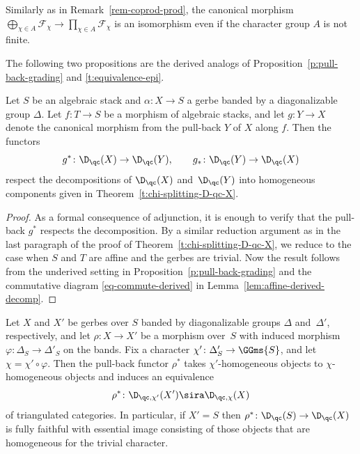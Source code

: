 \begin{remark}
Similarly as in Remark~\ref{rem-coprod-prod}, the canonical morphism
$
\bigoplus_{\chi\in A} \mathcal{F}_\chi
\to
\prod_{\chi\in A} \mathcal{F}_\chi
$
is an isomorphism even if the character group
$A$ is not finite.
\end{remark}

The following two propositions are the derived analogs of
Proposition~\ref{p:pull-back-grading} and \ref{t:equivalence-epi}.

\begin{proposition}
\label{p:pull-back-grading-derived}
Let $S$ be an algebraic stack and 
$\alpha\colon X \to S$ a gerbe banded by a diagonalizable group
$\Delta$.
Let $f\colon T \to S$ be a morphism of algebraic stacks,
and let $g\colon Y \to X$ denote the canonical morphism from the pull-back
$Y$ of $X$ along $f$.
Then the functors
$$
g^*\colon \D_\qc(X) \to \D_\qc(Y), \qquad
g_*\colon \D_\qc(Y) \to \D_\qc(X)
$$
respect the decompositions of $\D_\qc(X)$ and~$\D_\qc(Y)$
into homogeneous components given in Theorem~\ref{t:chi-splitting-D-qc-X}.
\end{proposition}
\begin{proof}
As a formal consequence of adjunction,
it is enough to verify that the pull-back $g^*$ respects the decomposition.
By a similar reduction argument as in the last paragraph of
the proof of Theorem~\ref{t:chi-splitting-D-qc-X},
we reduce to the case when $S$ and $T$ are affine and the gerbes are trivial.
Now the result follows from the underived setting in Proposition~\ref{p:pull-back-grading}
and the commutative diagram \eqref{eq-commute-derived} in Lemma~\ref{lem:affine-derived-decomp}.
\end{proof}

\begin{proposition}
  \label{t:equivalence-epi-derived}
  Let $X$ and $X'$ be gerbes over $S$ banded by diagonalizable groups $\Delta$ and~$\Delta'$,
  respectively, and let $\rho\colon X \to X'$ be a morphism over~$S$ with induced morphism $\varphi\colon \Delta_S \to \Delta'_S$ on the bands.
  Fix a character $\chi'\colon \Delta'_S \to \GGms{S}$, and let $\chi =
  \chi' \circ \varphi$.
  Then the pull-back functor $\rho^*$ takes $\chi'$-homogeneous
  objects to $\chi$-homogeneous 
  objects and induces an equivalence
  \begin{equation}
    \label{eq:restricted-pb-derived}
    \rho^*\colon \D_{\qc,\chi'}(X') \sira \D_{\qc,\chi}(X)
  \end{equation}
  of triangulated categories.
  In particular, if $X' = S$ then $\rho^*\colon \D_\qc(S) \to \D_\qc(X)$ is fully faithful with 
  essential image consisting of those objects that are
  homogeneous for the trivial character. 
\end{proposition}

